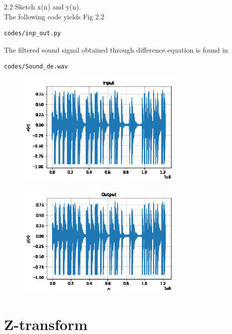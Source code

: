\documentclass[journal,12pt,twocolumn]{IEEEtran}
\begin{document}
2.2 Sketch x(n) and y(n).
\\
\solution
The following code yields Fig 2.2
\begin{lstlisting}
codes/inp_out.py
\end{lstlisting}
The filtered sound signal obtained through difference equation is found in
\begin{lstlisting}
codes/Sound_de.wav
\end{lstlisting}
\begin{figure}[!ht]
\begin{center}
\includegraphics[width=8cm]{./figs/input.eps}
\end{center}
\label{fig:Input}	
\end{figure}
\begin{figure}[!ht]
\begin{center}
\includegraphics[width=8cm]{./figs/output.eps}
\end{center}
\label{fig:Input}	
\end{figure}
\section{Z-transform}
\end{document}
